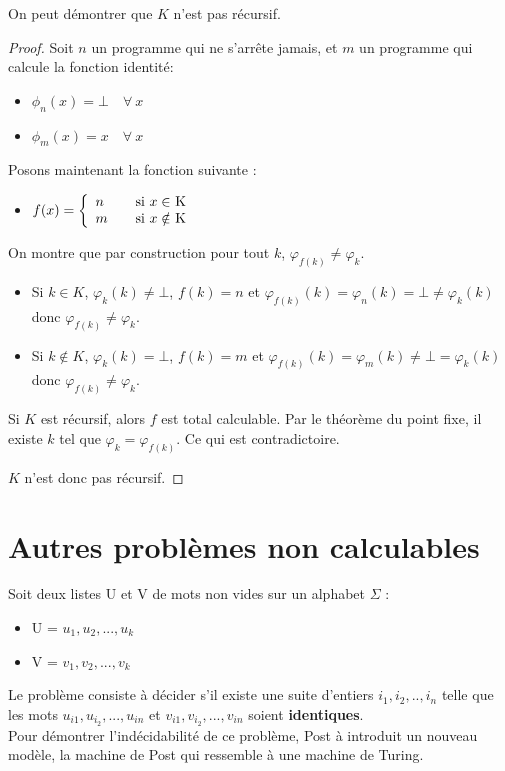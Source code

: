 \begin{myrem}
	On peut démontrer que $K$ n'est pas récursif.

    \begin{proof}
	Soit $n$ un programme qui ne s'arrête jamais, et $m$ un programme qui calcule la fonction identité: 
		\begin{itemize}
		\item $\phi_n(x) = \bot \quad \forall \ x$
		\item $\phi_m(x) = x \quad \forall  \ x$
	\end{itemize}
	Posons maintenant la  fonction suivante :
	\begin{itemize}

		\item $ f(x) = \left\{
		\begin{array}{l l}
			n & \quad \text{si $x\in$ K}\\
    		m & \quad \text{si $x\notin$ K}
		\end{array} \right.$
	\end{itemize}

    On montre que par construction pour tout $k$, $\varphi_{f(k)} \neq \varphi_k$.
    \begin{itemize}
      \item Si $k \in K$, $\varphi_k(k) \neq \bot$, $f(k) = n$ et
        $\varphi_{f(k)}(k) = \varphi_n(k) = \bot \neq \varphi_k(k)$ donc $\varphi_{f(k)} \neq \varphi_k$.
      \item Si $k \notin K$, $\varphi_k(k) = \bot$, $f(k) = m$ et
        $\varphi_{f(k)}(k) = \varphi_m(k) \neq \bot = \varphi_k(k)$ donc $\varphi_{f(k)} \neq \varphi_k$.
    \end{itemize}
    Si $K$ est récursif, alors $f$ est total calculable.
	Par le théorème du point fixe, il existe $k$ tel que $\varphi_k = \varphi_{f(k)}$.
    Ce qui est contradictoire.

    $K$ n'est donc pas récursif.
  \end{proof}
  
\end{myrem}

\section{Autres problèmes non calculables}
\label{sec:autres_probl_mes_non_calculable}

\begin{mydef} Soit deux listes U et V
	de mots non vides sur un alphabet $\Sigma$ :
	\begin{itemize}
		\item U = ${u_1,u_2,...,u_k}$
		\item V = ${v_1,v_2,...,v_k}$
	\end{itemize}
	Le problème consiste à décider s’il existe une suite d'entiers
	$i_1,i_2,..,i_n$ telle que les mots $u_{i1},u_{i_2},...,u_{in}$ et
	$v_{i1},v_{i_2},...,v_{in}$ soient \textbf{identiques}. \\
	Pour démontrer l'indécidabilité de ce problème, Post à introduit un
	nouveau modèle, la machine de Post qui ressemble à une machine de Turing.
\end{mydef}


